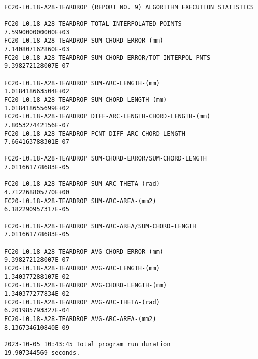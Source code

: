 \clearpage
\pagebreak
	
	
\begin{lstlisting}[caption={Snippet of Algorithm Summary Output}, label=snp-Algorithm Summary Output]	

FC20-L0.18-A28-TEARDROP (REPORT NO. 9) ALGORITHM EXECUTION STATISTICS 	
	
FC20-L0.18-A28-TEARDROP TOTAL-INTERPOLATED-POINTS          	7.599000000000E+03
FC20-L0.18-A28-TEARDROP SUM-CHORD-ERROR-(mm)               	7.140807162860E-03
FC20-L0.18-A28-TEARDROP SUM-CHORD-ERROR/TOT-INTERPOL-PNTS  	9.398272128007E-07
	
FC20-L0.18-A28-TEARDROP SUM-ARC-LENGTH-(mm)                	1.018418663504E+02
FC20-L0.18-A28-TEARDROP SUM-CHORD-LENGTH-(mm)              	1.018418655699E+02
FC20-L0.18-A28-TEARDROP DIFF-ARC-LENGTH-CHORD-LENGTH-(mm)  	7.805327442156E-07
FC20-L0.18-A28-TEARDROP PCNT-DIFF-ARC-CHORD-LENGTH         	7.664163788301E-07
	
FC20-L0.18-A28-TEARDROP SUM-CHORD-ERROR/SUM-CHORD-LENGTH   	7.011661778683E-05
	
FC20-L0.18-A28-TEARDROP SUM-ARC-THETA-(rad)                	4.712268805770E+00
FC20-L0.18-A28-TEARDROP SUM-ARC-AREA-(mm2)                 	6.182290957317E-05
	
FC20-L0.18-A28-TEARDROP SUM-ARC-AREA/SUM-CHORD-LENGTH      	7.011661778683E-05
	
FC20-L0.18-A28-TEARDROP AVG-CHORD-ERROR-(mm)               	9.398272128007E-07
FC20-L0.18-A28-TEARDROP AVG-ARC-LENGTH-(mm)                	1.340377288107E-02
FC20-L0.18-A28-TEARDROP AVG-CHORD-LENGTH-(mm)              	1.340377277834E-02
FC20-L0.18-A28-TEARDROP AVG-ARC-THETA-(rad)                	6.201985793327E-04
FC20-L0.18-A28-TEARDROP AVG-ARC-AREA-(mm2)                 	8.136734610840E-09

2023-10-05 10:43:45	Total program run duration   	        19.907344569 seconds. 

\end{lstlisting}
